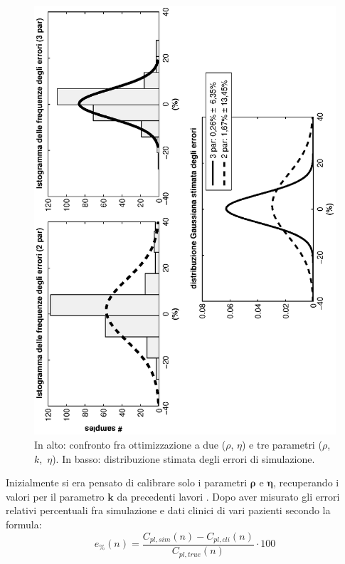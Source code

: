 \begin{figure}[htbp]
	\centering
		\includegraphics[angle=-90, width=\textwidth]{immagini/2vs3.eps}
	\caption{In alto: confronto fra ottimizzazione a due ($\rho$, $\eta$) e tre parametri ($\rho$,~$k$,~$\eta$). In basso: distribuzione stimata degli errori di simulazione.}
	\label{fig:2vs3}
\end{figure}
Inizialmente si era pensato di calibrare solo i parametri \textbf{$\boldsymbol{\rho}$} e \textbf{$\boldsymbol{\eta}$}, recuperando i valori per il parametro $\mathbf{k}$ da precedenti lavori \cite{casagrande,gatti}. Dopo aver misurato gli errori relativi percentuali fra simulazione e dati clinici di vari pazienti secondo la formula:
\begin{equation}\label{eq:Epercent}
	e_\%(n) = \frac{C_{pl,sim}(n) - C_{pl,cli}(n)}{C_{pl,true}(n)}\cdot 100
\end{equation}
